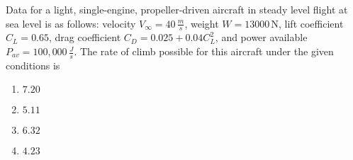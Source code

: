 \item Data for a light, single-engine, propeller-driven aircraft in steady level flight at sea level is as follows: velocity $V_{\infty} = 40 \, \frac{m}{s}$, weight $W = 13000 \, \text{N}$, lift coefficient $C_L = 0.65$, drag coefficient $C_D = 0.025 + 0.04 C_L^2$, and power available $P_{av} = 100,000 \, \frac{J}{s}$. The rate of climb possible for this aircraft under the given conditions is


\begin{enumerate}
    \item $7.20$
    \item $5.11$
    \item $6.32$
    \item $4.23$
\end{enumerate}



